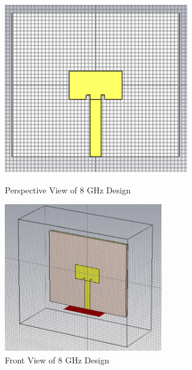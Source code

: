 \documentclass[a4paper,12pt]{report}
\begin{document}
\begin{figure}[H]
    \centering
    \begin{minipage}{0.48\textwidth}
        \centering
        \includegraphics[width=\textwidth]{4inset3.png}
        \caption{Perspective View of 8 GHz Design}
        \label{fig:4ghz_inset3}
    \end{minipage}
    \hfill %
    \begin{minipage}{0.48\textwidth}
        \centering
        \includegraphics[width=\textwidth]{8inset1.png}
        \caption{Front View of 8 GHz Design}
        \label{fig:8ghz_inset1}
    \end{minipage}
\end{figure}
\end{document}
